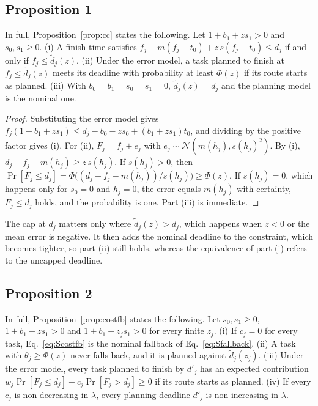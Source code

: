 \subsection{Proposition 1}
In full, Proposition~\ref{prop:cc} states the following. Let $1+b_1+zs_1>0$ and $s_0,s_1\ge0$. (i) A finish time
satisfies $f_j+m(f_j-t_0)+z\,s(f_j-t_0)\le d_j$ if and only if $f_j\le\tilde d_j(z)$. (ii) Under the error model, a task
planned to finish at $f_j\le\tilde d_j(z)$ meets its deadline with probability at least $\Phi(z)$ if its route starts as
planned. (iii) With $b_0=b_1=s_0=s_1=0$, $\tilde d_j(z)=d_j$ and the planning model is the nominal one.

\begin{proof}
Substituting the error model gives $f_j(1+b_1+zs_1)\le d_j-b_0-zs_0+(b_1+zs_1)t_0$, and dividing by the positive factor
gives (i). For (ii), $F_j=f_j+e_j$ with $e_j\sim\mathcal{N}(m(h_j),s(h_j)^2)$. By (i), $d_j-f_j-m(h_j)\ge z\,s(h_j)$. If
$s(h_j)>0$, then $\Pr[F_j\le d_j]=\Phi\big((d_j-f_j-m(h_j))/s(h_j)\big)\ge\Phi(z)$. If $s(h_j)=0$, which happens only
for $s_0=0$ and $h_j=0$, the error equals $m(h_j)$ with certainty, $F_j\le d_j$ holds, and the probability is one. Part
(iii) is immediate.
\end{proof}

The cap at $d_j$ matters only where $\tilde d_j(z)>d_j$, which happens when $z<0$ or the mean error is negative. It then
adds the nominal deadline to the constraint, which becomes tighter, so part (ii) still holds, whereas the equivalence of
part (i) refers to the uncapped deadline.

\subsection{Proposition 2}
In full, Proposition~\ref{prop:costfb} states the following. Let $s_0,s_1\ge0$, $1+b_1+zs_1>0$ and $1+b_1+z_js_1>0$
for every finite $z_j$. (i) If $c_j=0$ for every task, Eq.~\eqref{eq:Scostfb} is the nominal fallback of
Eq.~\eqref{eq:Sfallback}. (ii) A task with $\theta_j\ge\Phi(z)$ never falls back, and it is planned against
$\tilde d_j(z_j)$. (iii) Under the error model, every task planned to finish by $d'_j$ has an expected contribution
$w_j\Pr[F_j\le d_j]-c_j\Pr[F_j>d_j]\ge0$ if its route starts as planned. (iv) If every $c_j$ is non-decreasing in
$\lambda$, every planning deadline $d'_j$ is non-increasing in $\lambda$.

